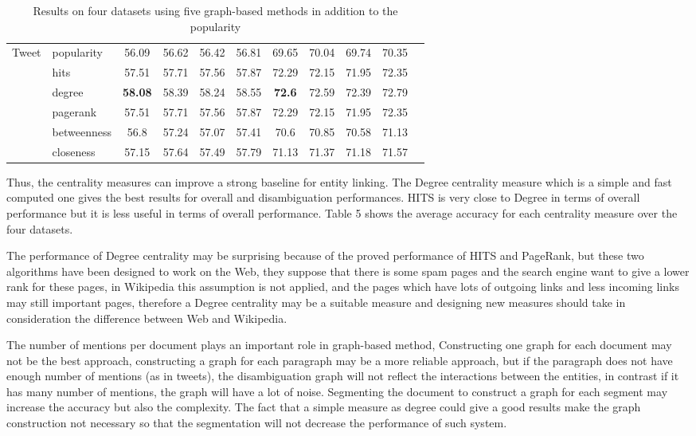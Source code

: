 \documentclass{llncs}
\begin{document}
\begin{table*}[!h]
{\begin{tabular}{|l|l||c|c|c|c||c|c|c|c|c|}
      \hline  
      Tweet  & popularity &  56.09  &   56.62  &  56.42  &  56.81   &  69.65  &   70.04  &  69.74  &  70.35  \\
 & hits &  57.51  &   57.71  &  57.56  &  57.87  &  72.29  &   72.15  &  71.95  &  72.35  \\
 & degree &  \textbf{58.08}  &   58.39  &  58.24  &  58.55  &  \textbf{72.6}  &   72.59  &  72.39  &  72.79  \\
 & pagerank &  57.51  &   57.71  &  57.56  &  57.87  &  72.29  &   72.15  &  71.95  &  72.35  \\
 & betweenness &  56.8  &   57.24  &  57.07  &  57.41   &  70.6  &   70.85  &  70.58  &  71.13  \\
 & closeness &  57.15  &   57.64  &  57.49  &  57.79  &  71.13  &   71.37  &  71.18  &  71.57  \\    
     \hline 
\end{tabular}}
\caption{Results on four datasets using five graph-based methods in addition to the popularity}
\end{table*}

Thus, the centrality measures can improve a strong baseline for entity linking. The Degree centrality measure which is a simple and fast computed one  gives the best results for overall and disambiguation performances.  HITS is very close to Degree in terms of overall performance but it is less useful in terms of overall performance. Table 5 shows the average accuracy for each centrality measure over the four datasets. 

The performance of Degree centrality may be surprising because of the proved performance of HITS and PageRank, but these two algorithms have been designed to work on the Web, they suppose that there is some spam pages and the search engine want to give a lower rank for these pages, in Wikipedia this assumption is not applied, and the pages which have lots of outgoing links and less incoming links may still  important pages, therefore a Degree centrality may be a suitable measure and designing new measures should take in consideration  the difference between  Web and Wikipedia.

The number of mentions per document plays an important role in graph-based method, Constructing one graph for each document may not be the best approach,  constructing a graph for each paragraph  may be a more reliable approach, but  if the paragraph does not have enough number of mentions (as in tweets), the disambiguation graph will not reflect the interactions between the entities, in contrast if it has many number of mentions, the graph will have a lot of noise. Segmenting the document to construct a graph for each segment may  increase the accuracy but also the complexity. The fact that a simple measure as  degree could give a good results make the graph construction  not necessary so that  the segmentation will not decrease the performance of such system.
\end{document}
